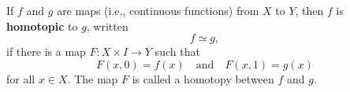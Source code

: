 If $f$ and $g$ are maps (i.e., continuous functions) from $X$ to $Y$, then $f$ is \textbf{homotopic} to $g$, written
$$f \simeq g,$$
if there is a map $F: X \times I \to Y$ such that
$$F(x,0) = f(x) \quad \text{and} \quad F(x,1) = g(x)$$
for all $x \in X$. The map $F$ is called a homotopy between $f$ and $g$.
